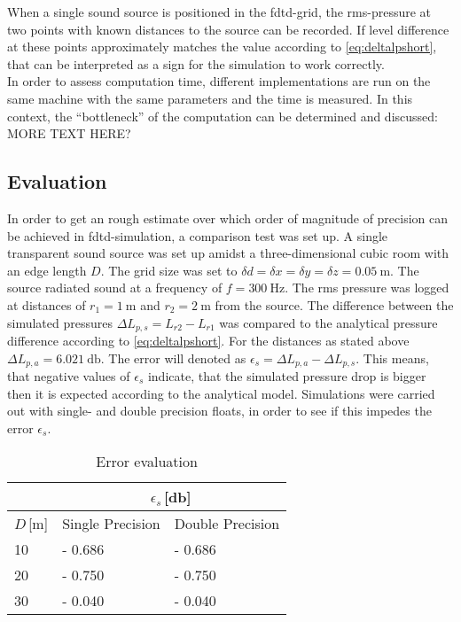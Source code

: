 When a single sound source is positioned in the \gls{fdtd}-grid, the \gls{rms}-pressure at two points with known distances to the source can be recorded. If level difference at these points approximately matches the value according to \autoref{eq:deltalpshort}, that can be interpreted as a sign for the simulation to work correctly.\\
In order to assess computation time, different implementations are run on the same machine with the same parameters and the time is measured. In this context, the ``bottleneck'' of the computation can be determined and discussed: MORE TEXT HERE?
\subsection{Evaluation}\label{ssec:evaluation}
In order to get an rough estimate over which order of magnitude of precision can be achieved in \gls{fdtd}-simulation, a comparison test was set up. A single transparent sound source was set up amidst a three-dimensional cubic room with an edge length $D$. The grid size was set to $\delta d=\delta x=\delta y=\delta z = \SI{0.05}{\meter}$. The source radiated sound at a frequency of $f=\SI{300}{\hertz}$. The \gls{rms} pressure was logged at distances of $r_1=\SI{1}{\meter}$ and $r_2=\SI{2}{\meter}$ from the source. The difference between the simulated pressures $\Delta L_{p,s}=L_{r2}-L_{r1}$ was compared to the analytical pressure difference according to \autoref{eq:deltalpshort}. For the distances as stated above $\Delta L_{p,a}=\SI{6.021}{\decibel}$. The error will denoted as $\epsilon_{s}=\Delta L_{p,a} - \Delta L_{p,s}$. This means, that negative values of $\epsilon_{s}$ indicate, that the simulated pressure drop is bigger then it is expected according to the analytical model. Simulations were carried out with single- and double precision floats, in order to see if this impedes the error $\epsilon_s$.\\
\begin{table}[h]
\centering
\caption{Error evaluation}
\label{tab:pressure_difference}
\begin{tabular}{l|l|l}
      & \multicolumn{2}{c}{\(\epsilon_s\)\,[\si{\decibel}]} \\ \hline
\(D\)\,[\si{\meter}] & Single Precision & Double Precision \\ \hline
10    & - 0.686          & - 0.686          \\ \hline
20    & - 0.750          & - 0.750          \\ \hline
30    & - 0.040          & - 0.040         
\end{tabular}
\end{table} 

